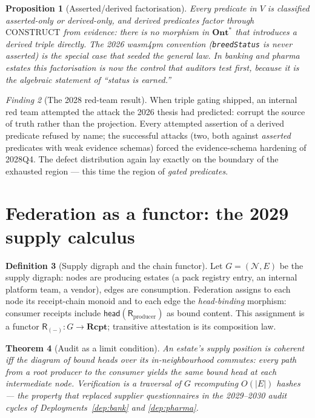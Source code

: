 \documentclass[11pt,a4paper]{report}
\newtheorem{theorem}{Theorem}[chapter]
\newtheorem{proposition}[theorem]{Proposition}
\theoremstyle{definition}
\newtheorem{definition}[theorem]{Definition}
\theoremstyle{remark}
\newtheorem{finding}[theorem]{Finding}
\newcommand{\Ont}{\mathbf{Ont}}
\newcommand{\Rcpt}{\mathbf{Rcpt}}
\newcommand{\rec}{\mathsf{R}}
\newcommand{\head}{\mathsf{head}}
\begin{document}
\begin{proposition}[Asserted/derived factorisation]
Every predicate in $V$ is classified asserted-only or derived-only, and
derived predicates factor through $\mathrm{CONSTRUCT}$ from evidence:
there is no morphism in $\Ont^{*}$ that introduces a derived triple
directly. The 2026 wasm4pm convention (\texttt{breedStatus} is never
asserted) is the special case that seeded the general law. In banking and
pharma estates this factorisation is now the control that auditors test
first, because it is the algebraic statement of ``status is earned.''
\end{proposition}

\begin{finding}[The 2028 red-team result]
When triple gating shipped, an internal red team attempted the attack the
2026 thesis had predicted: corrupt the source of truth rather than the
projection. Every attempted assertion of a derived predicate refused by
name; the successful attacks (two, both against \emph{asserted} predicates
with weak evidence schemas) forced the evidence-schema hardening of 2028Q4.
The defect distribution again lay exactly on the boundary of the exhausted
region --- this time the region of \emph{gated predicates}.
\end{finding}

\section{Federation as a functor: the 2029 supply calculus}

\begin{definition}[Supply digraph and the chain functor]
Let $G = (\mathcal{N}, E)$ be the supply digraph: nodes are producing
estates (a pack registry entry, an internal platform team, a vendor), edges
are consumption. Federation assigns to each node its receipt-chain monoid
and to each edge the \emph{head-binding} morphism: consumer receipts include
$\head(\rec_{\mathrm{producer}})$ as bound content. This assignment is a
functor $\rec_{(-)} : G \to \Rcpt$; transitive attestation is its
composition law.
\end{definition}

\begin{theorem}[Audit as a limit condition]\label{thm:limit}
An estate's supply position is \emph{coherent} iff the diagram of bound
heads over its in-neighbourhood commutes: every path from a root producer
to the consumer yields the same bound head at each intermediate node.
Verification is a traversal of $G$ recomputing $O(|E|)$ hashes ---
the property that replaced supplier questionnaires in the 2029--2030 audit
cycles of Deployments~\ref{dep:bank} and \ref{dep:pharma}.
\end{theorem}
\end{document}
